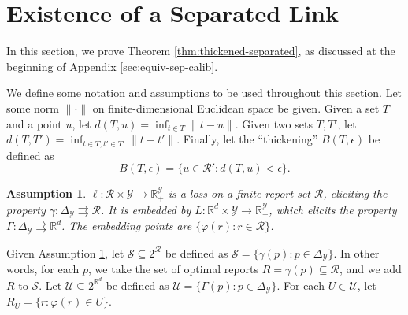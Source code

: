 \documentclass[11pt]{article}
\newcommand{\reals}{\mathbb{R}}
\newcommand{\simplex}{\Delta_\Y}
\newcommand{\R}{\mathcal{R}}
\newcommand{\U}{\mathcal{U}}
\newcommand{\Y}{\mathcal{Y}}
\newcommand{\toto}{\rightrightarrows}
\newcommand{\trim}{\mathrm{trim}}
\newtheorem{lemma}{Lemma}
\newtheorem{assumption}{Assumption}
\begin{document}




\section{Existence of a Separated Link} \label{app:sep-link-exists}
In this section, we prove Theorem \ref{thm:thickened-separated}, as discussed at the beginning of Appendix \ref{sec:equiv-sep-calib}.

We define some notation and assumptions to be used throughout this section.
Let some norm $\|\cdot\|$ on finite-dimensional Euclidean space be given.
Given a set $T$ and a point $u$, let $d(T,u) = \inf_{t \in T} \|t-u\|$.
Given two sets $T,T'$, let $d(T,T') = \inf_{t\in T, t' \in T'} \|t-t'\|$.
Finally, let the ``thickening'' $B(T,\epsilon)$ be defined as
  \[ B(T,\epsilon) = \{u \in \R' : d(T,u) < \epsilon \} . \]

\begin{assumption} \label{assume:cal}
  $\ell: \R \times \Y \to \reals^{\Y}_+$ is a loss on a finite report set $\R$, eliciting the property $\gamma: \simplex \toto \R$.
  It is embedded by $L: \reals^d \times \Y \to \reals^{\Y}_+$, which elicits the property $\Gamma: \simplex \toto \reals^d$.
  The embedding points are $\{\varphi(r) : r \in \R\}$.
\end{assumption}

Given Assumption \ref{assume:cal}, let $\mathcal{S} \subseteq 2^{\R}$ be defined as $\mathcal{S} = \{\gamma(p) : p \in \Delta_{\Y}\}$.
In other words, for each $p$, we take the set of optimal reports $R = \gamma(p) \subseteq \R$, and we add $R$ to $\mathcal{S}$.
Let $\U \subseteq 2^{\reals^d}$ be defined as $\U = \{\Gamma(p) : p \in \Delta_{\Y}\}$.
For each $U \in \U$, let $R_U = \{r: \varphi(r) \in U\}$.
\end{document}
